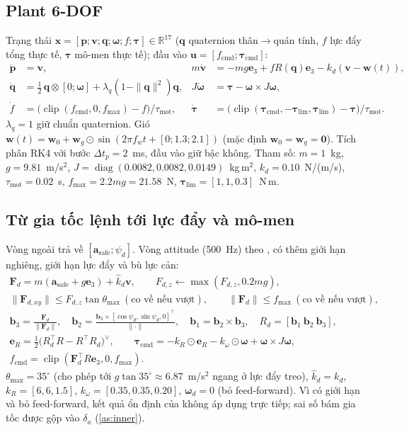 \documentclass[11pt,a4paper]{article}
\numberwithin{equation}{section}
\newcommand{\R}{\mathbb{R}}
\newcommand{\vb}[1]{\bm{#1}}
\newcommand{\T}{^{\!\top}}
\newcommand{\clip}{\operatorname{clip}}
\newcommand{\diag}{\operatorname{diag}}
\theoremstyle{definition}
\theoremstyle{plain}
\theoremstyle{remark}
\begin{document}
\subsection{Plant 6-DOF}
Trạng thái $\vb x=[\vb p;\vb v;\vb q;\bm\omega;f;\bm\tau]\in\R^{17}$ ($\vb q$ quaternion thân$\to$quán tính, $f$ lực đẩy tổng thực tế, $\bm\tau$ mô-men thực tế); đầu vào $\vb u=[f_{\text{cmd}};\bm\tau_{\text{cmd}}]$:
\begin{align}
\dot{\vb p}&=\vb v, &
m\dot{\vb v}&=-mg\vb e_3+fR(\vb q)\vb e_3-k_d(\vb v-\vb w(t)), \label{eq:plant1}\\
\dot{\vb q}&=\tfrac12\,\vb q\otimes[0;\bm\omega]+\lambda_q(1-\|\vb q\|^2)\vb q, &
J\dot{\bm\omega}&=\bm\tau-\bm\omega\times J\bm\omega, \label{eq:plant2}\\
\dot f&=\big(\clip(f_{\text{cmd}},0,f_{\max})-f\big)/\tau_{\text{mot}}, &
\dot{\bm\tau}&=\big(\clip(\bm\tau_{\text{cmd}},-\bm\tau_{\lim},\bm\tau_{\lim})-\bm\tau\big)/\tau_{\text{mot}}. \label{eq:plant3}
\end{align}
$\lambda_q=1$ giữ chuẩn quaternion. Gió $\vb w(t)=\vb w_0+\vb w_g\odot\sin(2\pi f_w t+[0;1.3;2.1])$ (mặc định $\vb w_0=\vb w_g=\vb 0$). Tích phân RK4 với bước $\Delta t_p=2$~ms, đầu vào giữ bậc không.
Tham số: $m=1$~kg, $g=9.81$~m/s$^2$, $J=\diag(0.0082,0.0082,0.0149)$~kg\,m$^2$, $k_d=0.10$~N/(m/s), $\tau_{\text{mot}}=0.02$~s, $f_{\max}=2.2mg=21.58$~N, $\bm\tau_{\lim}=[1,1,0.3]$~N\,m.

\subsection{Từ gia tốc lệnh tới lực đẩy và mô-men}
Vòng ngoài trả về $[\vb a_{\text{safe}};\psi_d]$. Vòng attitude (500~Hz) theo \cite{lee2011se3}, có thêm giới hạn nghiêng, giới hạn lực đẩy và bù lực cản:
\begin{gather}
\vb F_d=m(\vb a_{\text{safe}}+g\vb e_3)+\hat k_d\vb v,\qquad F_{d,z}\leftarrow\max(F_{d,z},0.2mg), \label{eq:Fd}\\
\|\vb F_{d,xy}\|\le F_{d,z}\tan\theta_{\max}\ (\text{co về nếu vượt}),\qquad \|\vb F_d\|\le f_{\max}\ (\text{co về nếu vượt}), \nonumber\\
\vb b_3=\frac{\vb F_d}{\|\vb F_d\|},\quad \vb b_2=\frac{\vb b_3\times[\cos\psi_d,\sin\psi_d,0]\T}{\|\cdot\|},\quad \vb b_1=\vb b_2\times\vb b_3,\quad R_d=[\vb b_1\ \vb b_2\ \vb b_3], \label{eq:Rd}\\
\vb e_R=\tfrac12\big(R_d\T R-R\T R_d\big)^\vee,\qquad
\bm\tau_{\text{cmd}}=-k_R\odot\vb e_R-k_\omega\odot\bm\omega+\bm\omega\times J\bm\omega,\nonumber\\
f_{\text{cmd}}=\clip(\vb F_d\T R\vb e_3,0,f_{\max}). \label{eq:att}
\end{gather}
$\theta_{\max}=35^\circ$ (cho phép tới $g\tan35^\circ\approx6.87$~m/s$^2$ ngang ở lực đẩy treo), $\hat k_d=k_d$, $k_R=[6,6,1.5]$, $k_\omega=[0.35,0.35,0.20]$, $\bm\omega_d=0$ (bỏ feed-forward). Vì có giới hạn và bỏ feed-forward, kết quả ổn định của \cite{lee2011se3} không áp dụng trực tiếp; sai số bám gia tốc được gộp vào $\delta_a$ (\ref{as:inner}).
\end{document}
